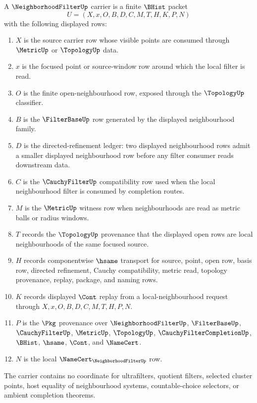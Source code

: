 \begin{definition}
\label{def:neighborhood-filter-carrier}
A $\NeighborhoodFilterUp$ carrier is a finite $\BHist$ packet
$$
U=(X,x,O,B,D,C,M,T,H,K,P,N)
$$
with the following displayed rows:
\begin{enumerate}
\item $X$ is the source carrier row whose visible points are consumed through $\MetricUp$ or $\TopologyUp$ data.
\item $x$ is the focused point or source-window row around which the local filter is read.
\item $O$ is the finite open-neighbourhood row, exposed through the $\TopologyUp$ classifier.
\item $B$ is the $\FilterBaseUp$ row generated by the displayed neighbourhood family.
\item $D$ is the directed-refinement ledger: two displayed neighbourhood rows admit a smaller displayed neighbourhood row before any filter consumer reads downstream data.
\item $C$ is the $\CauchyFilterUp$ compatibility row used when the local neighbourhood filter is consumed by completion routes.
\item $M$ is the $\MetricUp$ witness row when neighbourhoods are read as metric balls or radius windows.
\item $T$ records the $\TopologyUp$ provenance that the displayed open rows are local neighbourhoods of the same focused source.
\item $H$ records componentwise $\hsame$ transport for source, point, open row, basis row, directed refinement, Cauchy compatibility, metric read, topology provenance, replay, package, and naming rows.
\item $K$ records displayed $\Cont$ replay from a local-neighbourhood request through $X,x,O,B,D,C,M,T,H,P,N$.
\item $P$ is the $\Pkg$ provenance over $\NeighborhoodFilterUp$, $\FilterBaseUp$, $\CauchyFilterUp$, $\MetricUp$, $\TopologyUp$, $\CauchyFilterCompletionUp$, $\BHist$, $\hsame$, $\Cont$, and $\NameCert$.
\item $N$ is the local $\NameCert_{\NeighborhoodFilterUp}$ row.
\end{enumerate}
The carrier contains no coordinate for ultrafilters, quotient filters, selected cluster points, host equality of neighbourhood systems, countable-choice selectors, or ambient completion theorems.
\end{definition}

